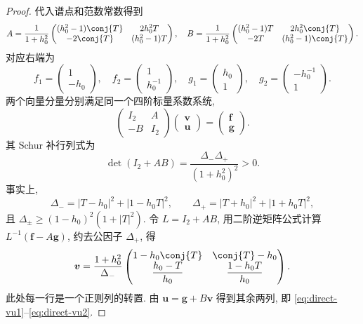 \begin{proof}
代入谱点和范数常数得到
\begin{equation}\label{eq:one-AB}
A=\dfrac{1}{1+h_0^2}
\begin{pmatrix}(h_0^2-1)\conj{T}&2h_0^2T\\-2\conj{T}&(h_0^2-1)T\end{pmatrix},\quad
B=\dfrac{1}{1+h_0^2}
\begin{pmatrix}(h_0^2-1)T&2h_0^2\conj{T}\\-2T&(h_0^2-1)\conj{T}\end{pmatrix}.
\end{equation}
对应右端为
\[
f_1=\begin{pmatrix}1\\-h_0\end{pmatrix},\quad
f_2=\begin{pmatrix}1\\h_0^{-1}\end{pmatrix},\quad
g_1=\begin{pmatrix}h_0\\1\end{pmatrix},\quad
g_2=\begin{pmatrix}-h_0^{-1}\\1\end{pmatrix}.
\]
两个向量分量分别满足同一个四阶标量系数系统,
\[
\begin{pmatrix}I_2&A\\-B&I_2\end{pmatrix}
\begin{pmatrix}\boldsymbol v\\\boldsymbol u\end{pmatrix}
=\begin{pmatrix}\boldsymbol f\\\boldsymbol g\end{pmatrix}.
\]
其 Schur 补行列式为
\begin{equation}\label{eq:one-schur-det}
\det(I_2+AB)=\dfrac{\Delta_-\Delta_+}{(1+h_0^2)^2}>0.
\end{equation}
事实上,
\[
\Delta_-=|T-h_0|^2+|1-h_0T|^2,\qquad
\Delta_+=|T+h_0|^2+|1+h_0T|^2,
\]
且 $\Delta_\pm\ge(1-h_0)^2(1+|T|^2)$. 令 $L=I_2+AB$, 用二阶逆矩阵公式计算 $L^{-1}(\boldsymbol f-A\boldsymbol g)$, 约去公因子 $\Delta_+$, 得
\[
\boldsymbol v=\dfrac{1+h_0^2}{\Delta_-}
\begin{pmatrix}1-h_0\conj{T}&\conj{T}-h_0\\
\dfrac{h_0-T}{h_0}&\dfrac{1-h_0T}{h_0}\end{pmatrix}.
\]
此处每一行是一个正则列的转置. 由 $\boldsymbol u=\boldsymbol g+B\boldsymbol v$ 得到其余两列, 即 \eqref{eq:direct-vu1}--\eqref{eq:direct-vu2}.
\end{proof}

